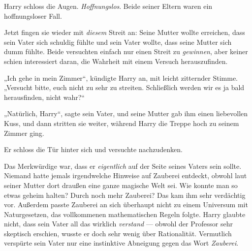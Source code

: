 Harry schloss die Augen. \emph{Hoffnungslos}. Beide seiner Eltern waren ein hoffnungsloser Fall.

Jetzt fingen sie wieder mit \emph{diesem} Streit an: Seine Mutter wollte erreichen, dass sein Vater sich schuldig fühlte und sein Vater wollte, dass seine Mutter sich dumm fühlte. Beide versuchten einfach nur einen Streit zu \emph{gewinnen}, aber keiner schien interessiert daran, die Wahrheit mit einem Versuch herauszufinden.

„Ich gehe in mein Zimmer“, kündigte Harry an, mit leicht zitternder Stimme.
„Versucht bitte, euch nicht zu sehr zu streiten. Schließlich werden wir es ja bald herausfinden, nicht wahr?“

„Natürlich, Harry“, sagte sein Vater, und seine Mutter gab ihm einen liebevollen Kuss, und dann stritten sie weiter, während Harry die Treppe hoch zu seinem Zimmer ging.

Er schloss die Tür hinter sich und versuchte nachzudenken.

Das Merkwürdige war, dass er \emph{eigentlich} auf der Seite seines Vaters sein sollte. Niemand hatte jemals irgendwelche Hinweise auf Zauberei entdeckt, obwohl laut seiner Mutter dort draußen eine ganze magische Welt sei. Wie konnte man so etwas geheim halten? Durch noch mehr Zauberei? Das kam ihm sehr verdächtig vor. Außerdem passte Zauberei an sich überhaupt nicht zu einem Universum mit Naturgesetzen, das vollkommenen mathematischen Regeln folgte. Harry glaubte nicht, dass sein Vater all das wirklich \emph{verstand} — obwohl der Professor sehr skeptisch erschien, wusste er doch sehr wenig über Rationalität. Vermutlich verspürte sein Vater nur eine instinktive Abneigung gegen das Wort \emph{Zauberei}.


